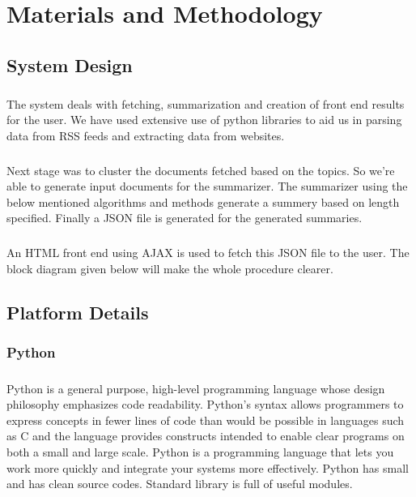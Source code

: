 \chapter{Materials and Methodology}
\section{System Design}
\paragraph{} The system deals with fetching, summarization and creation of front end results for the user. We have used extensive use of python libraries to aid us in parsing data from RSS feeds and extracting data from websites. 
\paragraph{} Next stage was to cluster the documents fetched based on the topics. So we're able to generate input documents for the summarizer. The summarizer using the below mentioned algorithms and methods generate a summery based on length specified. Finally a JSON file is generated for the generated summaries. 
\paragraph{} An HTML front end using AJAX is used to fetch this JSON file to the user. The block diagram given below will make the whole procedure clearer.
\section{Platform Details}
\subsection{Python}

\paragraph{} Python is a general purpose, high-level programming language whose design philosophy emphasizes code readability. Python's syntax allows programmers to express concepts in fewer lines of code than would be possible in languages such as C and the language provides constructs intended to enable clear programs on both a small and large scale. Python is a programming language that lets you work more quickly and integrate your systems more effectively. Python has small and has clean source codes. Standard library is full of useful modules.
